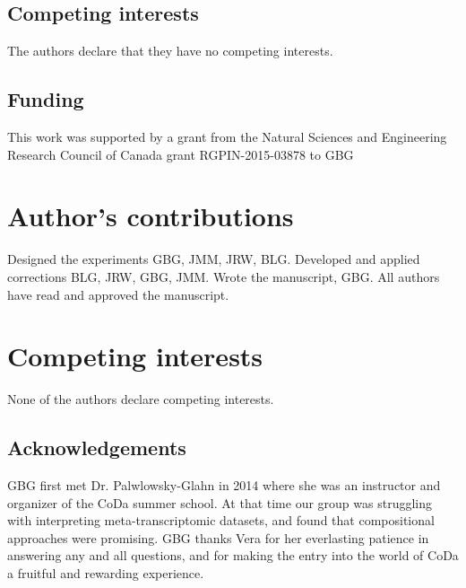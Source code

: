 \documentclass[graybox]{svmult}
\begin{document}
\subsection*{Competing interests}
The authors declare that they have no competing interests.
  
\subsection*{Funding}
This work was supported by a grant from the Natural Sciences and Engineering Research Council of Canada grant RGPIN-2015-03878 to GBG

\section*{Author's contributions}
 Designed the experiments GBG, JMM, JRW, BLG. Developed and applied corrections BLG, JRW, GBG, JMM. Wrote the manuscript, GBG. All authors have read and approved the manuscript.

\section{Competing interests}

None of the authors declare competing interests.

\subsection*{Acknowledgements}
GBG first met Dr. Palwlowsky-Glahn in 2014 where she was an instructor and organizer of the CoDa summer school. At that time our group was struggling with interpreting meta-transcriptomic datasets, and found that compositional approaches were promising. GBG thanks Vera for her everlasting patience in answering any and all questions, and for making the entry into the world of CoDa a fruitful and rewarding experience.

%

%
\end{document}

